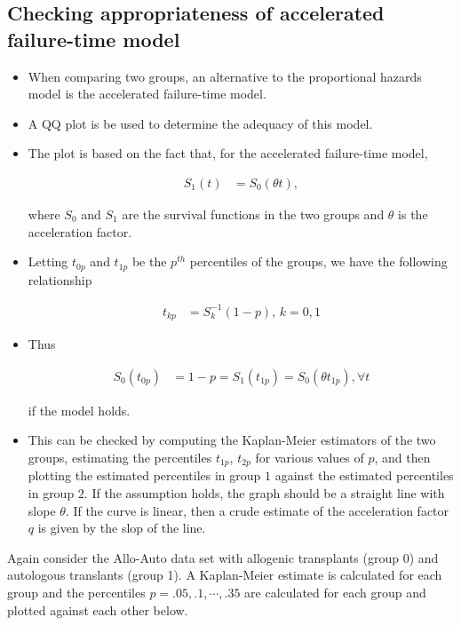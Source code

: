 \documentclass[10pt]{article}\usepackage[]{graphicx}\usepackage[]{xcolor}
\theoremstyle{definition}
\numberwithin{equation}{subsection}
\numberwithin{figure}{section}
\numberwithin{table}{subsection}
\numberwithin{Report}{section}
\numberwithin{Example}{subsection}
\begin{document}
\subsection{Checking appropriateness of accelerated failure-time model}
\begin{itemize}
\item When comparing two groups, an alternative to the proportional hazards model is the accelerated failure-time model.
\item A QQ plot is be used to determine the adequacy of this model.
\item The plot is based on the fact that, for the accelerated failure-time model,

\begin{align*}
S_{1}(t) & =S_{0}(\theta t),
\end{align*}

where $S_{0}$ and $S_{1}$ are the survival functions in the two
groups and $\theta$ is the acceleration factor.

\item Letting $t_{0p}$ and $t_{1p}$ be the $p^{th}$ percentiles
of the groups, we have the following relationship

\begin{align*}
t_{kp} & =S_{k}^{-1}(1-p), \, k = 0,1
\end{align*}

\item Thus 

\begin{align*}
S_{0}(t_{0p}) & =1-p=S_{1}(t_{1p})=S_{0}(\theta t_{1p}), \forall t
\end{align*}

if the model holds.

\item This can be checked by computing the Kaplan-Meier estimators of the
two groups, estimating the percentiles $t_{1p}$, $t_{2p}$ for various
values of $p$, and then plotting the estimated percentiles in group
$1$ against the estimated percentiles in group $2$. If the assumption
holds, the graph should be a straight line with slope $\theta$. If the curve is linear, then a crude estimate of the acceleration factor $q$ is given by the slop of the line. \end{itemize}


\noindent Again consider the Allo-Auto data set with allogenic transplants (group 0) and autologous translants (group 1). A Kaplan-Meier estimate is calculated for each group and the percentiles $p=.05,.1,\cdots,.35$ are calculated for each group and plotted against each other below.
\end{document}
